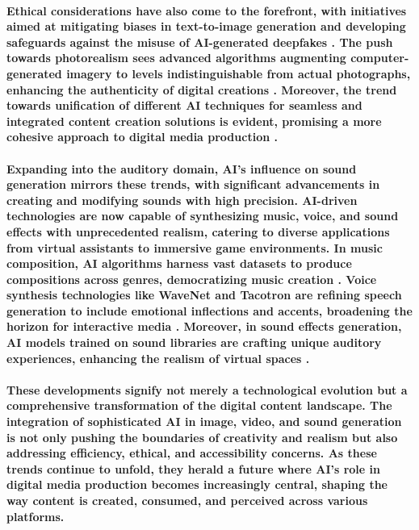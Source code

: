 \documentclass[11pt,a4paper,oneside]{report}
\begin{document}
\paragraph{Ethical considerations have also come to the forefront, with initiatives aimed at mitigating biases in text-to-image generation and developing safeguards against the misuse of AI-generated deepfakes \cite{esposito2023mitigating}. The push towards photorealism sees advanced algorithms augmenting computer-generated imagery to levels indistinguishable from actual photographs, enhancing the authenticity of digital creations \cite{richter2022enhancing}. Moreover, the trend towards unification of different AI techniques for seamless and integrated content creation solutions is evident, promising a more cohesive approach to digital media production \cite{esser2022towards}.}

\paragraph{Expanding into the auditory domain, AI's influence on sound generation mirrors these trends, with significant advancements in creating and modifying sounds with high precision. AI-driven technologies are now capable of synthesizing music, voice, and sound effects with unprecedented realism, catering to diverse applications from virtual assistants to immersive game environments. In music composition, AI algorithms harness vast datasets to produce compositions across genres, democratizing music creation \cite{briot2021artificial}. Voice synthesis technologies like WaveNet and Tacotron are refining speech generation to include emotional inflections and accents, broadening the horizon for interactive media \cite{oord2016wavenet}. Moreover, in sound effects generation, AI models trained on sound libraries are crafting unique auditory experiences, enhancing the realism of virtual spaces \cite{greshler2021catch}.}

\paragraph{These developments signify not merely a technological evolution but a comprehensive transformation of the digital content landscape. The integration of sophisticated AI in image, video, and sound generation is not only pushing the boundaries of creativity and realism but also addressing efficiency, ethical, and accessibility concerns. As these trends continue to unfold, they herald a future where AI's role in digital media production becomes increasingly central, shaping the way content is created, consumed, and perceived across various platforms.}
\end{document}
